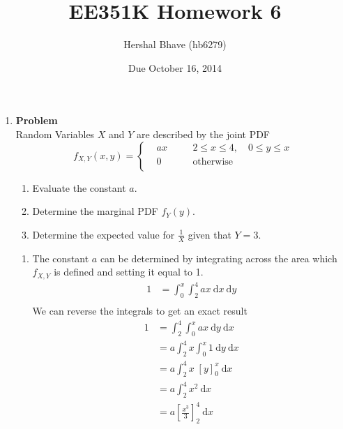 \documentclass[12pt]{article}
\title{EE351K Homework 6}
\author{Hershal Bhave (hb6279)}
\date{Due October 16, 2014}
\newenvironment{Ex}{\textbf{Problem}\vspace{.75em}\\}{}
\newcommand{\dd}[1]{\:\mathrm{d}{#1}}
\begin{document}
\maketitle
\begin{enumerate}
\item
  \begin{Ex}
    Random Variables $X$ and $Y$ are described by the joint PDF
    \begin{equation}
      \label{eq:1-question}
      f_{X,Y}(x,y) = \left\{
        \begin{aligned}
          & ax &&\quad 2\le x\le 4,\quad 0\le y \le x \\
          & 0 &&\quad \text{otherwise} \\
        \end{aligned}\right.
    \end{equation}
    \begin{enumerate}
    \item Evaluate the constant $a$.
    \item Determine the marginal PDF $f_Y(y)$.
    \item Determine the expected value for $\frac{1}{X}$ given that $Y=3$.
    \end{enumerate}
    \begin{solution} \hfill
      \begin{enumerate}
      \item The constant $a$ can be determined by integrating across
        the area which $f_{X,Y}$ is defined and setting it equal to 1.
        \begin{equation}
          \label{eq:1a-presol}
          \begin{aligned}
            1 &= \int_0^x \int_2^4 ax \dd{x} \dd{y} \\
          \end{aligned}
        \end{equation}
        We can reverse the integrals to get an exact result
        \begin{equation}
          \label{eq:1a-sol}
          \begin{aligned}
            1 &= \int_2^4 \int_0^x ax \dd{y} \dd{x} \\
            &= a \int_2^4 x \int_0^x 1 \dd{y} \dd{x} \\
            &= a \int_2^4 x \; [y]_0^x \dd{x} \\
            &= a \int_2^4 x^2 \dd{x} \\
            &= a \left[\frac{x^3}{3}\right]_2^4 \dd{x} \\

\end{aligned}
\end{equation}
\end{enumerate}
\end{solution}
\end{Ex}
\end{enumerate}
\end{document}
